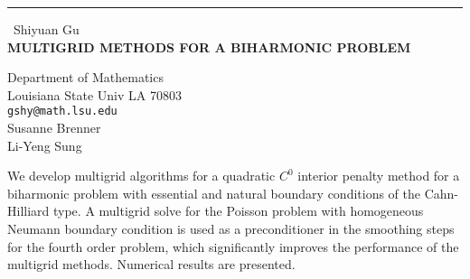 \documentclass{report}
\begin{document}
\begin{center}
\rule{6in}{1pt} \
{\large Shiyuan Gu \\
{\bf MULTIGRID METHODS FOR A BIHARMONIC PROBLEM}}

Department of Mathematics \\ Louisiana State Univ LA 70803
\\
{\tt gshy@math.lsu.edu}\\
Susanne Brenner\\
Li-Yeng Sung\end{center}

We develop multigrid algorithms for a quadratic $C^0$ interior penalty
method for a biharmonic problem with essential and natural boundary
conditions of the Cahn-Hilliard type. A multigrid solve for the Poisson
problem with homogeneous Neumann boundary condition is used as a
preconditioner in the smoothing steps for the fourth order problem, which
significantly improves the performance of the multigrid methods.
Numerical results are presented.
\end{document}
